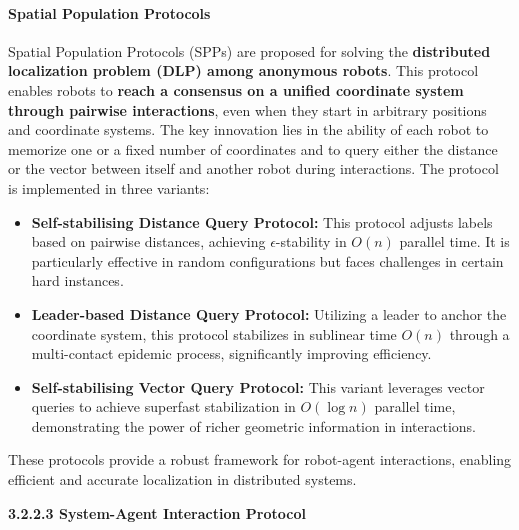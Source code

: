 \documentclass[10pt,preprint]{article}
\begin{document}
\paragraph{Spatial Population Protocols~\citep{gąsieniec2024anonymousdistributedlocalisationspatial}} Spatial Population Protocols (SPPs) are proposed for solving the \textbf{distributed localization problem (DLP) among anonymous robots}. This protocol enables robots to \textbf{reach a consensus on a unified coordinate system through pairwise interactions}, even when they start in arbitrary positions and coordinate systems. The key innovation lies in the ability of each robot to memorize one or a fixed number of coordinates and to query either the distance or the vector between itself and another robot during interactions. The protocol is implemented in three variants:
\begin{itemize}
    \item \textbf{Self-stabilising Distance Query Protocol:} This protocol adjusts labels based on pairwise distances, achieving $\epsilon$-stability in $O(n)$ parallel time. It is particularly effective in random configurations but faces challenges in certain hard instances.
    \item \textbf{Leader-based Distance Query Protocol:} Utilizing a leader to anchor the coordinate system, this protocol stabilizes in sublinear time $O(n)$ through a multi-contact epidemic process, significantly improving efficiency.
    \item \textbf{Self-stabilising Vector Query Protocol:} This variant leverages vector queries to achieve superfast stabilization in $O(\log n)$ parallel time, demonstrating the power of richer geometric information in interactions.
\end{itemize}
These protocols provide a robust framework for robot-agent interactions, enabling efficient and accurate localization in distributed systems.

\vspace{1ex}
\noindent\textbf{3.2.2.3 System-Agent Interaction Protocol}
\vspace{1ex}

\end{document}
